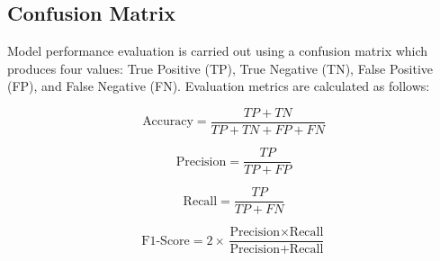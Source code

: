 \subsection{Confusion Matrix}

Model performance evaluation is carried out using a confusion matrix which produces four values: True Positive (TP), True Negative (TN), False Positive (FP), and False Negative (FN). Evaluation metrics are calculated as follows:

\begin{equation}
\text{Accuracy} = \frac{TP + TN}{TP + TN + FP + FN}
\end{equation}

\begin{equation}
\text{Precision} = \frac{TP}{TP + FP}
\end{equation}

\begin{equation}
\text{Recall} = \frac{TP}{TP + FN}
\end{equation}

\begin{equation}
\text{F1-Score} = 2 \times \frac{\text{Precision} \times \text{Recall}}{\text{Precision} + \text{Recall}}
\end{equation}
